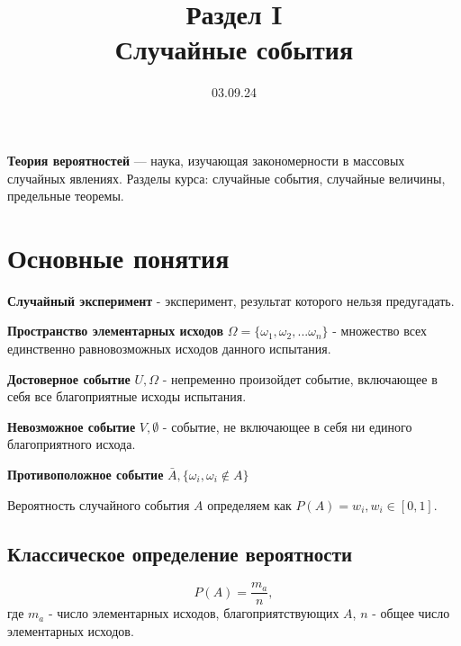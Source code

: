 

\title{Раздел I \\
       Случайные события}
\date{03.09.24}


    \maketitle
    
    \textbf{Теория вероятностей} — наука, изучающая закономерности 
    в массовых случайных явлениях. Разделы курса: случайные события, случайные 
    величины, предельные теоремы.

    \section{Основные понятия}
    \begin{opr}
        \textbf{Случайный эксперимент} - эксперимент, результат которого
        нельзя предугадать.
    \end{opr}

    \begin{opr}
        \textbf{Пространство элементарных исходов} \(\Omega = \{\omega_1, \omega_2, ... \omega_n\}\)
         - множество всех единственно равновозможных исходов данного испытания.
    \end{opr}

    \begin{opr}
        \textbf{Достоверное событие} \(U, \Omega\) - непременно произойдет событие,
        включающее в себя все благоприятные исходы испытания. 
    \end{opr}

    \begin{opr}
        \textbf{Невозможное событие} \(V, \emptyset\) - событие, не включающее
        в себя ни единого благоприятного исхода.
    \end{opr}

    \begin{opr}
        \textbf{Противоположное событие} \(\bar A, \{\omega_i, \omega_i \notin A\}\)
    \end{opr}
    
    Вероятность случайного события \(A\) определяем как \(P(A) = w_i, w_i \in [0,1]\).
    

    \subsection{Классическое определение вероятности}
    \begin{opr}
        \begin{equation}
            P(A) = \frac{m_{a}}{n},
        \end{equation}
        где \(m_{a}\) - число элементарных исходов, благоприятствующих \(A\),
        \(n\) - общее число элементарных исходов.
    \end{opr}

